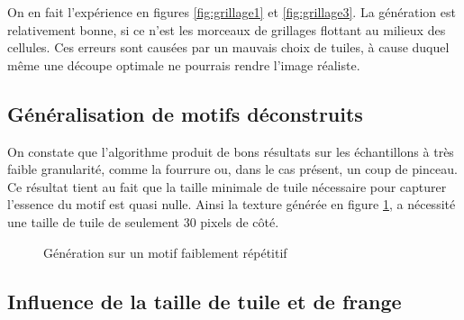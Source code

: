 \documentclass{article}
\begin{document}
On en fait l'expérience en figures \ref{fig:grillage1} et \ref{fig:grillage3}. La génération est relativement bonne, si ce n'est les morceaux de grillages flottant au milieux des cellules. Ces erreurs sont causées par un mauvais choix de tuiles, à cause duquel même une découpe optimale ne pourrais rendre l'image réaliste.




\subsection{Généralisation de motifs déconstruits}

On constate que l'algorithme produit de bons résultats sur les échantillons à très faible granularité, comme la fourrure ou, dans le cas présent, un coup de pinceau. Ce résultat tient au fait que la taille minimale de tuile nécessaire pour capturer l'essence du motif est quasi nulle. Ainsi la texture générée en figure \ref{fig:orange}, a nécessité une taille de tuile de seulement 30 pixels de côté.

\begin{figure}
	\centering
	\qquad
	\caption{Génération sur un motif faiblement répétitif\label{fig:orange}}
\end{figure}

\subsection{Influence de la taille de tuile et de frange}
\end{document}
